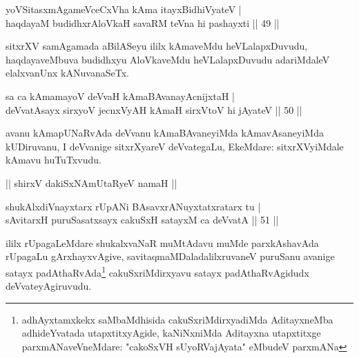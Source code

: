 
\begin{shl}
yoVSitasxmAgameVceCxVha kAma itayxBidhiVyateV |\\
haqdayaM budidhxrAloVkaH savaRM teVna hi pashayxti \hfill || 49 ||
\end{shl}

\begin{artha}
sitxrXV samAgamada aBilASeyu ililx kAmaveMdu heVLalapxDuvudu, haqdayaveMbuva budidhxyu AloVkaveMdu heVLalapxDuvudu adariMdaleV elalxvanUnx kANuvanaSeTx.
\end{artha}

\begin{shl}
sa ca kAmamayoV deVvaH kAmaBAvanayA\s cnijxtaH |\\
deVvatA\s sayx sirxyoV jecnxVyAH kAmaH sirxVtoV hi jAyateV \hfill || 50 ||
\end{shl}

\begin{artha}
avanu kAmapUNaRvAda deVvanu kAmaBAvaneyiMda kAmavAsaneyiMda kUDiruvanu, I deVvanige sitxrXyareV deVvategaLu, EkeMdare: sitxrXVyiMdale kAmavu huTuTxvudu.
\end{artha}



\begin{center}%
|| shirxV dakiSxNAmUtaRyeV namaH ||
\end{center}


\begin{shl}
shukAlxdiVnayxtarx rUpANi BAsavxrANuyxtatxratarx tu |\\
sAvitarxH puruSasatxsayx cakuSxH satayxM ca deVvatA \hfill || 51 ||
\end{shl}

\begin{artha}
ililx rUpagaLeMdare shukalxvaNaR muMtAdavu muMde parxkAshavAda rUpagaLu gArxhayxvAgive, savitaqmaMDaladalilxruvaneV puruSanu avanige satayx padAthaRvAda\footnote{adhAyxtamxkekx saMbaMdhisida cakuSxriMdirxyadiMda AditayxneMba adhideYvatada utapxtitxyAgide, kaNiNxniMda Aditayxna utapxtitxge parxmANaveVneMdare: "cakoSxVH sUyoRVajAyata" eMbudeV parxmANa} cakuSxriMdirxyavu satayx padAthaRvAgidudx deVvateyAgiruvudu.
\end{artha}

